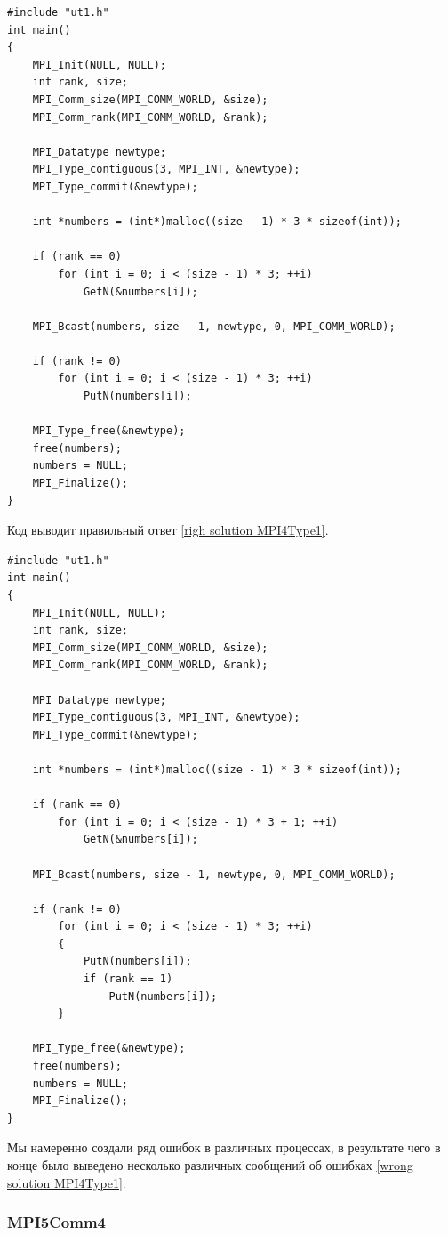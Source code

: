 \lstset{language=c++}
\begin{lstlisting}
#include "ut1.h"
int main()
{
	MPI_Init(NULL, NULL);
	int rank, size;
	MPI_Comm_size(MPI_COMM_WORLD, &size);
	MPI_Comm_rank(MPI_COMM_WORLD, &rank);

	MPI_Datatype newtype;
	MPI_Type_contiguous(3, MPI_INT, &newtype);
	MPI_Type_commit(&newtype);

	int *numbers = (int*)malloc((size - 1) * 3 * sizeof(int));

	if (rank == 0)
		for (int i = 0; i < (size - 1) * 3; ++i)
			GetN(&numbers[i]);

	MPI_Bcast(numbers, size - 1, newtype, 0, MPI_COMM_WORLD);

	if (rank != 0)
		for (int i = 0; i < (size - 1) * 3; ++i)
			PutN(numbers[i]);

	MPI_Type_free(&newtype);
	free(numbers);
	numbers = NULL;
	MPI_Finalize();
}
\end{lstlisting}

Код выводит правильный ответ \ref{righ solution MPI4Type1}.

\lstset{language=c++}
\begin{lstlisting}
#include "ut1.h"
int main()
{
	MPI_Init(NULL, NULL);
	int rank, size;
	MPI_Comm_size(MPI_COMM_WORLD, &size);
	MPI_Comm_rank(MPI_COMM_WORLD, &rank);

	MPI_Datatype newtype;
	MPI_Type_contiguous(3, MPI_INT, &newtype);
	MPI_Type_commit(&newtype);

	int *numbers = (int*)malloc((size - 1) * 3 * sizeof(int));

	if (rank == 0)
		for (int i = 0; i < (size - 1) * 3 + 1; ++i)
			GetN(&numbers[i]);

	MPI_Bcast(numbers, size - 1, newtype, 0, MPI_COMM_WORLD);

	if (rank != 0)
		for (int i = 0; i < (size - 1) * 3; ++i)
		{
			PutN(numbers[i]);
			if (rank == 1)
				PutN(numbers[i]);
		}

	MPI_Type_free(&newtype);
	free(numbers);
	numbers = NULL;
	MPI_Finalize();
}
\end{lstlisting}

Мы намеренно создали ряд ошибок в различных процессах, в результате чего в конце было выведено несколько различных сообщений об ошибках \ref{wrong solution MPI4Type1}.


\subsubsection{MPI5Comm4}

